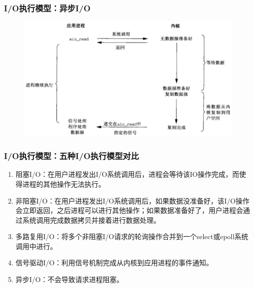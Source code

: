 \begin{frame}[fragile]
    \frametitle{I/O执行模型：异步I/O}
    \begin{figure}
        \includegraphics[width=0.8\linewidth]{figs/async-io.png}
    \end{figure}
\end{frame}
\begin{frame}[fragile]
    \frametitle{I/O执行模型：五种I/O执行模型对比}
    
    \begin{enumerate}
        
        \item 阻塞I/O：在用户进程发出I/O系统调用后，进程会等待该IO操作完成，而使得进程的其他操作无法执行。
        \item 非阻塞I/O：在用户进程发出I/O系统调用后，如果数据没准备好，该I/O操作会立即返回，之后进程可以进行其他操作；如果数据准备好了，用户进程会通过系统调用完成数据拷贝并接着进行数据处理。
        \item 多路复用I/O：将多个非阻塞I/O请求的轮询操作合并到一个select或epoll系统调用中进行。
        \item 信号驱动I/O：利用信号机制完成从内核到应用进程的事件通知。
        \item 异步I/O：不会导致请求进程阻塞。
    \end{enumerate}       
    
    
\end{frame}
